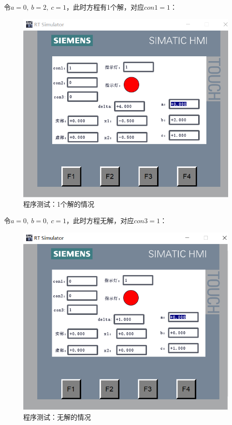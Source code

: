\documentclass[UTF8]{article}
\begin{document}
令$a = 0,\ b = 2,\ c = 1$，此时方程有1个解，对应$con1 = 1$：
\begin{figure}[H]
    \centering %
    \includegraphics[width=.8\textwidth]{figure/一个解.png} 
    \caption{程序测试：1个解的情况} %
\end{figure}

令$a = 0,\ b = 0,\ c = 1$，此时方程无解，对应$con3 = 1$：
\begin{figure}[H]
    \centering %
    \includegraphics[width=.8\textwidth]{figure/无解.png} 
    \caption{程序测试：无解的情况} %
\end{figure}
\end{document}

